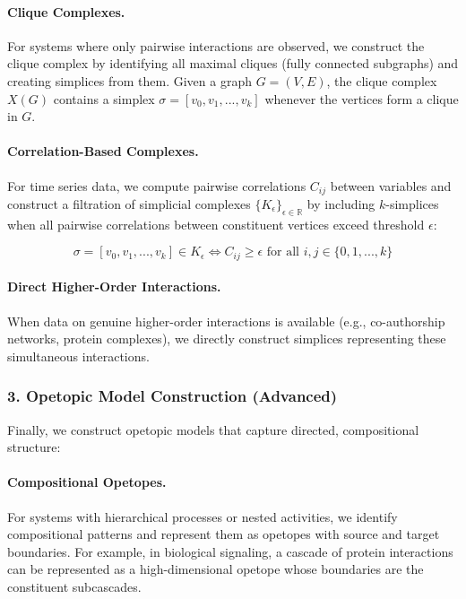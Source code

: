 \paragraph{Clique Complexes.} For systems where only pairwise interactions are observed, we construct the clique complex by identifying all maximal cliques (fully connected subgraphs) and creating simplices from them. Given a graph $G = (V, E)$, the clique complex $X(G)$ contains a simplex $\sigma = [v_0, v_1, ..., v_k]$ whenever the vertices form a clique in $G$.

\paragraph{Correlation-Based Complexes.} For time series data, we compute pairwise correlations $C_{ij}$ between variables and construct a filtration of simplicial complexes $\{K_\epsilon\}_{\epsilon \in \mathbb{R}}$ by including $k$-simplices when all pairwise correlations between constituent vertices exceed threshold $\epsilon$:

\begin{equation}
\sigma = [v_0, v_1, ..., v_k] \in K_\epsilon \iff C_{ij} \geq \epsilon \text{ for all } i,j \in \{0,1,...,k\}
\end{equation}

\paragraph{Direct Higher-Order Interactions.} When data on genuine higher-order interactions is available (e.g., co-authorship networks, protein complexes), we directly construct simplices representing these simultaneous interactions.

\subsubsection{3. Opetopic Model Construction (Advanced)}
Finally, we construct opetopic models that capture directed, compositional structure:

\paragraph{Compositional Opetopes.} For systems with hierarchical processes or nested activities, we identify compositional patterns and represent them as opetopes with source and target boundaries. For example, in biological signaling, a cascade of protein interactions can be represented as a high-dimensional opetope whose boundaries are the constituent subcascades.


